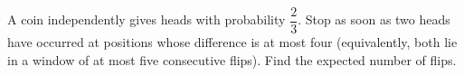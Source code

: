 A coin independently gives heads with probability $\dfrac{2}{3}$. Stop as soon as two heads have occurred at positions whose difference is at most four (equivalently, both lie in a window of at most five consecutive flips). Find the expected number of flips.
